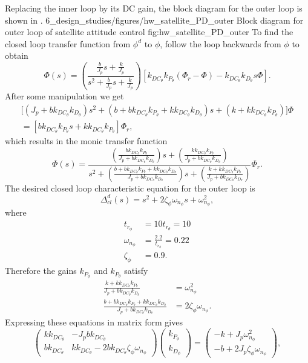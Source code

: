 Replacing the inner loop by its DC gain, the block diagram for the outer loop is shown in .
	{6_design_studies/figures/hw_satellite_PD_outer}
	{Block diagram for outer loop of satellite attitude control}
	{fig:hw_satellite_PD_outer}
To find the closed loop transfer function from $\phi^d$ to $\phi$, follow the loop backwards from $\phi$ to obtain
\[
\Phi(s) = \left(\frac{\frac{b}{J_p}s+\frac{k}{J_p}}{s^2+\frac{b}{J_p}s+\frac{k}{J_p}}\right)\left[k_{DC_\theta}k_{P_\theta}(\Phi_r-\Phi)-k_{DC_\theta}k_{D_\theta}s\Phi\right].
\]
After some manipulation we get
\begin{multline}
\big[(J_p+bk_{DC_\theta}k_{D_\theta})s^2 + (b+bk_{DC_\theta}k_{P_\theta}+kk_{DC_\theta}k_{D_\theta})s 
	 + (k+kk_{DC_\theta}k_{P_\theta})\big]\Phi \\ = \left[bk_{DC_\theta}k_{P_\theta}s+kk_{DC_\theta}k_{P_\theta}\right]\Phi_r,
\end{multline}
which results in the monic transfer function
\[
\Phi(s)=\frac{\left(\frac{bk_{DC_\theta}k_{P_\theta}}{J_p+bk_{DC_\theta}k_{D_\theta}}\right)s+\left(\frac{kk_{DC_\theta}k_{P_\theta}}{J_p+bk_{DC_\theta}k_{D_\theta}}\right)}{s^2 + \left(\frac{b+bk_{DC_\theta}k_{P_\theta}+kk_{DC_\theta}k_{D_\theta}}{J_p+bk_{DC_\theta}k_{D_\theta}}\right)s + \left(\frac{k+kk_{DC_\theta}k_{P_\theta}}{J_p+bk_{DC_\theta}k_{D_\theta}}\right)} \Phi_r.
\]
The desired closed loop characteristic equation for the outer loop is
\[
\Delta_{cl}^d(s) = s^2 + 2\zeta_{\phi}\omega_{n_\phi} s + \omega_{n_\phi}^2,
\]
where
\begin{align*}
t_{r_\phi} &= 10 t_{r_\theta} = 10 \\
\omega_{n_\phi} &= \frac{2.2}{t_{r_\phi}} = 0.22 \\
\zeta_{\phi} &= 0.9.
\end{align*}
Therefore the gains $k_{P_\phi}$ and $k_{P_\theta}$ satisfy
\begin{align*}
\frac{k+kk_{DC_\theta}k_{P_\theta}}{J_p+bk_{DC_\theta}k_{D_\theta}} &= \omega_{n_\phi}^2 \\
\frac{b+bk_{DC_\theta}k_{P_\theta}+kk_{DC_\theta}k_{D_\theta}}{J_p+bk_{DC_\theta}k_{D_\theta}} &= 2\zeta_{\phi}\omega_{n_\phi}.
\end{align*}
Expressing these equations in matrix form gives
\[
\begin{pmatrix} kk_{DC_\theta} & -J_pbk_{DC_\theta} \\ bk_{DC_\theta} & kk_{DC_\theta}-2bk_{DC_\theta}\zeta_\phi\omega_{n_\phi} \end{pmatrix}\begin{pmatrix}k_{P_\phi}\\k_{D_\phi}\end{pmatrix} = \begin{pmatrix} -k + J_p\omega_{n_\phi}^2 \\ -b + 2J_p\zeta_\phi\omega_{n_\phi} \end{pmatrix},
\]
